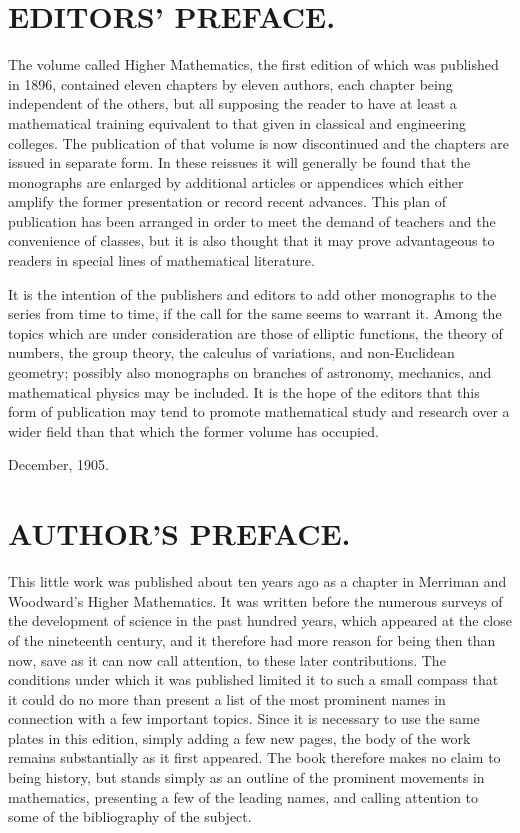 \documentclass[oneside]{book}
\begin{document}
\newpage

\chapter{EDITORS' PREFACE.}

The volume called Higher Mathematics, the first edition of which was
published in 1896, contained eleven chapters by eleven authors, each
chapter being independent of the others, but all supposing the
reader to have at least a mathematical training equivalent to that
given in classical and engineering colleges. The publication of that
volume is now discontinued and the chapters are issued in separate
form. In these reissues it will generally be found that the
monographs are enlarged by additional articles or appendices which
either amplify the former presentation or record recent
advances. This plan of publication has been arranged in order to
meet the demand of teachers and the convenience of classes, but it
is also thought that it may prove advantageous to readers in special
lines of mathematical literature.

It is the intention of the publishers and editors to add other
monographs to the series from time to time, if the call for the same
seems to warrant it. Among the topics which are under consideration
are those of elliptic functions, the theory of numbers, the group
theory, the calculus of variations, and non-Euclidean geometry;
possibly also monographs on branches of astronomy, mechanics, and
mathematical physics may be included. It is the hope of the editors
that this form of publication may tend to promote mathematical study
and research over a wider field than that which the former volume
has occupied.

\bigskip

December, 1905.

\normalsize

\chapter{AUTHOR'S PREFACE.}

This little work was published about ten years ago as a chapter in
Merriman and Woodward's Higher Mathematics. It was written before
the numerous surveys of the development of science in the past
hundred years, which appeared at the close of the nineteenth
century, and it therefore had more reason for being then than now,
save as it can now call attention, to these later contributions. The
conditions under which it was published limited it to such a small
compass that it could do no more than present a list of the most
prominent names in connection with a few important topics. Since it
is necessary to use the same plates in this edition, simply adding a
few new pages, the body of the work remains substantially as it
first appeared. The book therefore makes no claim to being history,
but stands simply as an outline of the prominent movements in
mathematics, presenting a few of the leading names, and calling
attention to some of the bibliography of the subject.
\end{document}
